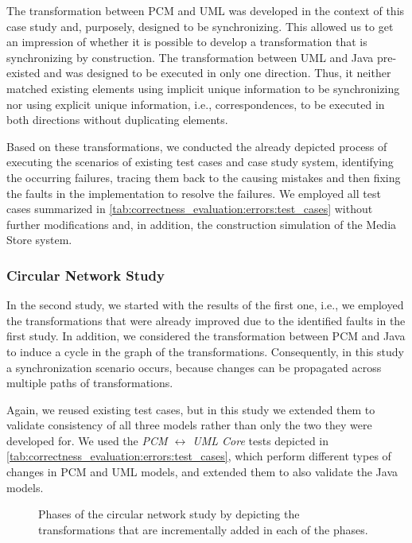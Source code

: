 The transformation between \gls{PCM} and \gls{UML} was developed in the context of this case study and, purposely, designed to be synchronizing.
This allowed us to get an impression of whether it is possible to develop a transformation that is synchronizing by construction.
The transformation between \gls{UML} and Java pre-existed and was designed to be executed in only one direction.
Thus, it neither matched existing elements using implicit unique information to be synchronizing nor using explicit unique information, i.e., correspondences, to be executed in both directions without duplicating elements.

Based on these transformations, we conducted the already depicted process of executing the scenarios of existing test cases and case study system, identifying the occurring failures, tracing them back to the causing mistakes and then fixing the faults in the implementation to resolve the failures.
We employed all test cases summarized in \autoref{tab:correctness_evaluation:errors:test_cases} without further modifications and, in addition, the construction simulation of the Media Store system.

\subsubsection*{Circular Network Study} 

In the second study, we started with the results of the first one, i.e., we employed the transformations that were already improved due to the identified faults in the first study.
In addition, we considered the transformation between \gls{PCM} and Java to induce a cycle in the graph of the transformations.
Consequently, in this study a synchronization scenario occurs, because changes can be propagated across multiple paths of transformations.

Again, we reused existing test cases, but in this study we extended them to validate consistency of all three models rather than only the two they were developed for.
We used the \emph{PCM $\leftrightarrow$ \gls{UML} Core} tests depicted in \autoref{tab:correctness_evaluation:errors:test_cases}, which perform different types of changes in \gls{PCM} and \gls{UML} models, and extended them to also validate the Java models.

\begin{figure}
    \centering
    
    \caption[Phases of second case study]{Phases of the circular network study by depicting the transformations that are incrementally added in each of the phases.}
    \label{fig:correctness_evaluation:errors:study_phases}
\end{figure}

